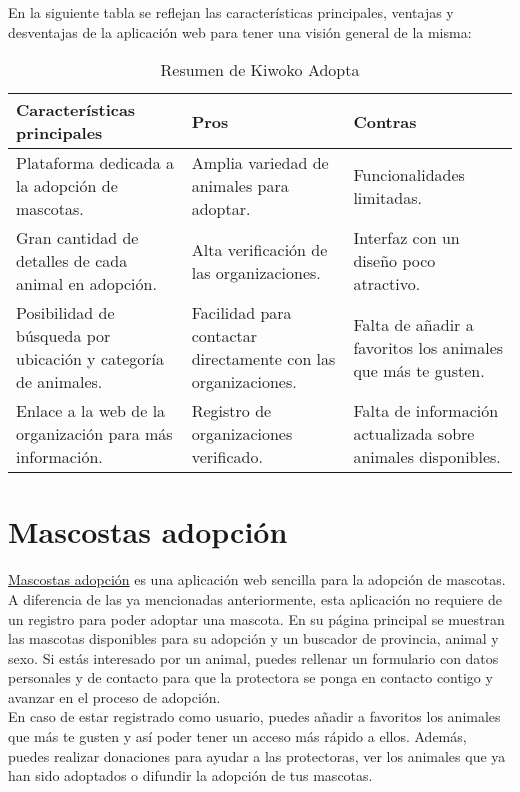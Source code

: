 En la siguiente tabla se reflejan las características principales, ventajas y desventajas de la aplicación web
para tener una visión general de la misma: \\

\begin{table}[h]
\centering
\begin{tabular}{|p{6cm}|p{4cm}|p{4cm}|}
\hline
\textbf{Características principales} & \textbf{Pros} & \textbf{Contras} \\
\hline
Plataforma dedicada a la adopción de mascotas. &
Amplia variedad de animales para adoptar. &
Funcionalidades limitadas. \\
\hline
Gran cantidad de detalles de cada animal en adopción. &
Alta verificación de las organizaciones. &
Interfaz con un diseño poco atractivo. \\
\hline
Posibilidad de búsqueda por ubicación y categoría de animales. &
Facilidad para contactar directamente con las organizaciones. &
Falta de añadir a favoritos los animales que más te gusten. \\
\hline
Enlace a la web de la organización para más información. &
Registro de organizaciones verificado. &
Falta de información actualizada sobre animales disponibles. \\
\hline
\end{tabular}
\caption{Resumen de Kiwoko Adopta}
\label{tab:kiwoko-adopta}
\end{table}


\section{Mascostas adopción}\label{sec:mascostas}

\href{https://mascotasadopcion.com}{Mascostas adopción} es una aplicación web sencilla para la adopción de mascotas.
A diferencia de las ya mencionadas anteriormente, esta aplicación no requiere de un registro para poder adoptar una
mascota. En su página principal se muestran las mascotas disponibles para su adopción y un buscador de provincia,
animal y sexo. Si estás interesado por un animal, puedes rellenar un formulario con datos personales y de contacto
para que la protectora se ponga en contacto contigo y avanzar en el proceso de adopción. \\

En caso de estar registrado como usuario, puedes añadir a favoritos los animales que más te gusten y así poder
tener un acceso más rápido a ellos. Además, puedes realizar donaciones para ayudar a las protectoras, ver los animales
que ya han sido adoptados o difundir la adopción de tus mascotas. \\

